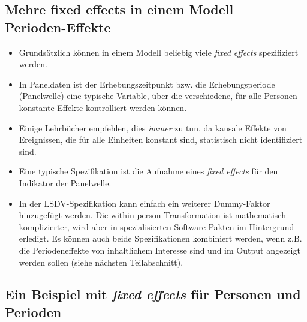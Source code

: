 \documentclass[
]{book}
\newenvironment{Shaded}{\begin{snugshade}}{\end{snugshade}}
\newcommand{\DataTypeTok}[1]{\textcolor[rgb]{0.13,0.29,0.53}{#1}}
\newcommand{\DecValTok}[1]{\textcolor[rgb]{0.00,0.00,0.81}{#1}}
\newcommand{\KeywordTok}[1]{\textcolor[rgb]{0.13,0.29,0.53}{\textbf{#1}}}
\newcommand{\NormalTok}[1]{#1}
\newcommand{\OperatorTok}[1]{\textcolor[rgb]{0.81,0.36,0.00}{\textbf{#1}}}
\newcommand{\StringTok}[1]{\textcolor[rgb]{0.31,0.60,0.02}{#1}}
\providecommand{\tightlist}{%
  \setlength{\itemsep}{0pt}\setlength{\parskip}{0pt}}
\begin{document}
\hypertarget{mehre-fixed-effects-in-einem-modell-perioden-effekte}{%
\subsection*{Mehre fixed effects in einem Modell -- Perioden-Effekte}\label{mehre-fixed-effects-in-einem-modell-perioden-effekte}}

\begin{itemize}
\tightlist
\item
  Grundsätzlich können in einem Modell beliebig viele \emph{fixed effects} spezifiziert werden.
\item
  In Paneldaten ist der Erhebungszeitpunkt bzw. die Erhebungsperiode (Panelwelle) eine typische Variable, über die verschiedene, für alle Personen konstante Effekte kontrolliert werden können.
\item
  Einige Lehrbücher empfehlen, dies \emph{immer} zu tun, da kausale Effekte von Ereignissen, die für alle Einheiten konstant sind, statistisch nicht identifiziert sind.
\item
  Eine typische Spezifikation ist die Aufnahme eines \emph{fixed effects} für den Indikator der Panelwelle.
\item
  In der LSDV-Spezifikation kann einfach ein weiterer Dummy-Faktor hinzugefügt werden. Die within-person Transformation ist mathematisch komplizierter, wird aber in spezialisierten Software-Pakten im Hintergrund erledigt. Es können auch beide Spezifikationen kombiniert werden, wenn z.B. die Periodeneffekte von inhaltlichem Interesse sind und im Output angezeigt werden sollen (siehe nächsten Teilabschnitt).
\end{itemize}

\hypertarget{ein-beispiel-mit-fixed-effects-fuxfcr-personen-und-perioden}{%
\subsection*{\texorpdfstring{Ein Beispiel mit \emph{fixed effects} für Personen und Perioden}{Ein Beispiel mit fixed effects für Personen und Perioden}}\label{ein-beispiel-mit-fixed-effects-fuxfcr-personen-und-perioden}}

\begin{Shaded}
\end{Shaded}
\end{document}
